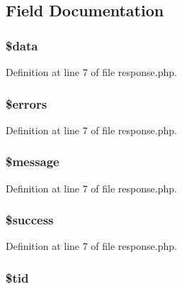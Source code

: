 \subsection{\-Field \-Documentation}
\hypertarget{class_response_a6efc15b5a2314dd4b5aaa556a375c6d6}{
\subsubsection[{\$data}]{\setlength{\rightskip}{0pt plus 5cm}\$data}}\label{class_response_a6efc15b5a2314dd4b5aaa556a375c6d6}


\-Definition at line 7 of file response.\-php.

\hypertarget{class_response_ab24faf4aa647cdcee494fc48524ad4ff}{
\subsubsection[{\$errors}]{\setlength{\rightskip}{0pt plus 5cm}\$errors}}\label{class_response_ab24faf4aa647cdcee494fc48524ad4ff}


\-Definition at line 7 of file response.\-php.

\hypertarget{class_response_abf17cb2dba2ed17cb28aa5f37deb5293}{
\subsubsection[{\$message}]{\setlength{\rightskip}{0pt plus 5cm}\$message}}\label{class_response_abf17cb2dba2ed17cb28aa5f37deb5293}


\-Definition at line 7 of file response.\-php.

\hypertarget{class_response_a944564ee11ad329573548875b62a269e}{
\subsubsection[{\$success}]{\setlength{\rightskip}{0pt plus 5cm}\$success}}\label{class_response_a944564ee11ad329573548875b62a269e}


\-Definition at line 7 of file response.\-php.

\hypertarget{class_response_a4450bdc73ff7cfb495cb4ec69c98fce8}{
\subsubsection[{\$tid}]{\setlength{\rightskip}{0pt plus 5cm}\$tid}}\label{class_response_a4450bdc73ff7cfb495cb4ec69c98fce8}


